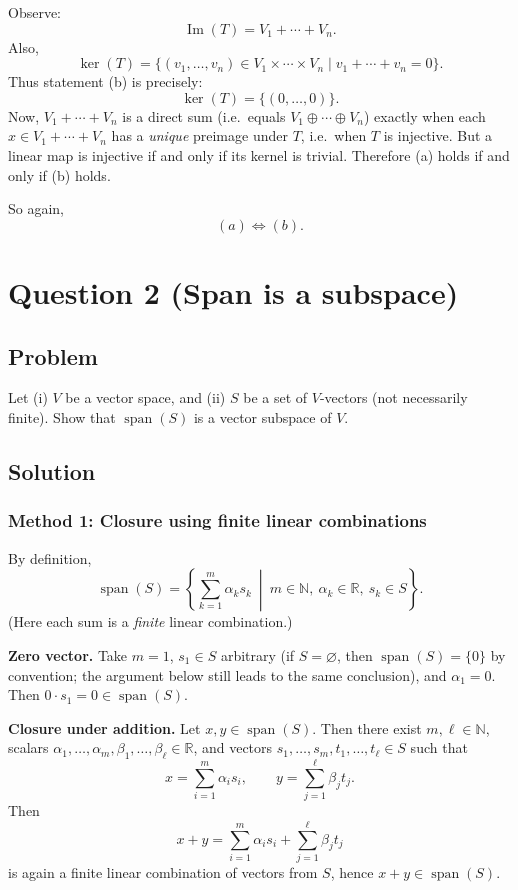 \documentclass[12pt]{article}
\newcommand{\R}{\mathbb{R}}
\newcommand{\Span}{\operatorname{span}}
\begin{document}
Observe:
\[
\operatorname{Im}(T)=V_1+\cdots+V_n.
\]
Also,
\[
\ker(T)=\{(v_1,\ldots,v_n)\in V_1\times\cdots\times V_n \mid v_1+\cdots+v_n=0\}.
\]
Thus statement (b) is precisely:
\[
\ker(T)=\{(0,\ldots,0)\}.
\]
Now, \(V_1+\cdots+V_n\) is a direct sum (i.e.\ equals \(V_1\oplus\cdots\oplus V_n\)) exactly when each \(x\in V_1+\cdots+V_n\) has a \emph{unique} preimage under \(T\), i.e.\ when \(T\) is injective.
But a linear map is injective if and only if its kernel is trivial.
Therefore (a) holds if and only if (b) holds.

So again,
\[
\boxed{\ (a)\Longleftrightarrow (b).\ }
\]

\newpage
\section{Question 2 (Span is a subspace)}
\subsection{Problem}
Let (i) \(V\) be a vector space, and (ii) \(S\) be a set of \(V\)-vectors (not necessarily finite).
Show that \(\Span(S)\) is a vector subspace of \(V\).

\subsection{Solution}

\subsubsection{Method 1: Closure using finite linear combinations}
By definition,
\[
\Span(S)=\left\{\sum_{k=1}^m \alpha_k s_k \ \middle|\ m\in\mathbb{N},\ \alpha_k\in\R,\ s_k\in S\right\}.
\]
(Here each sum is a \emph{finite} linear combination.)

\textbf{Zero vector.}
Take \(m=1\), \(s_1\in S\) arbitrary (if \(S=\varnothing\), then \(\Span(S)=\{0\}\) by convention; the argument below still leads to the same conclusion), and \(\alpha_1=0\).
Then \(0\cdot s_1=0\in \Span(S)\).

\textbf{Closure under addition.}
Let \(x,y\in \Span(S)\).
Then there exist \(m,\ell\in\mathbb{N}\), scalars \(\alpha_1,\ldots,\alpha_m,\beta_1,\ldots,\beta_\ell\in\R\), and vectors \(s_1,\ldots,s_m,t_1,\ldots,t_\ell\in S\) such that
\[
x=\sum_{i=1}^m \alpha_i s_i,
\qquad
y=\sum_{j=1}^\ell \beta_j t_j.
\]
Then
\[
x+y=\sum_{i=1}^m \alpha_i s_i+\sum_{j=1}^\ell \beta_j t_j
\]
is again a finite linear combination of vectors from \(S\), hence \(x+y\in \Span(S)\).
\end{document}
